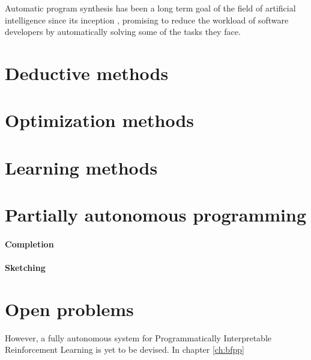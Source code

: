 Automatic program synthesis has been a long term goal of the field of artificial intelligence since its inception \cite{mannaAutomaticProgramSynthesis1971a}, promising to reduce the workload of software developers by automatically solving some of the tasks they face.

\section{Deductive methods}

\section{Optimization methods}

\section{Learning methods}

\section{Partially autonomous programming}

\paragraph{Completion}

\paragraph{Sketching}

\section{Open problems}

However, a fully autonomous system for Programmatically Interpretable Reinforcement Learning is yet to be devised. In chapter \ref{ch:bfpp}